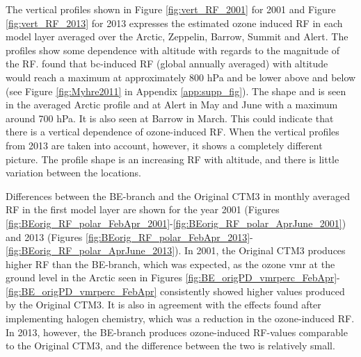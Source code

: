 \medskip

The vertical profiles shown in Figure \ref{fig:vert_RF_2001} for 2001 and Figure \ref{fig:vert_RF_2013} for 2013 expresses the estimated ozone induced RF in each model layer averaged over the Arctic, Zeppelin, Barrow, Summit and Alert. The profiles show some dependence with altitude with regards to the magnitude of the RF. \cite{MYHRE2011387} found that \acrfull{bc}-induced RF (global annually averaged) with altitude would reach a maximum at approximately 800 hPa and be lower above and below (see Figure \ref{fig:Myhre2011} in Appendix \ref{app:supp_fig}). The shape and is seen in the averaged Arctic profile and at Alert in May and June with a maximum around 700 hPa. It is also seen at Barrow in March. This could indicate that there is a vertical dependence of ozone-induced RF. When the vertical profiles from 2013 are taken into account, however, it shows a completely different picture. The profile shape is an increasing RF with altitude, and there is little variation between the locations. 


\medskip

Differences between the BE-branch and the Original CTM3 in monthly averaged RF in the first model layer are shown for the year 2001 (Figures \ref{fig:BEorig_RF_polar_FebApr_2001}-\ref{fig:BEorig_RF_polar_AprJune_2001}) and 2013 (Figures \ref{fig:BEorig_RF_polar_FebApr_2013}-\ref{fig:BEorig_RF_polar_AprJune_2013}). In 2001, the Original CTM3 produces higher RF than the BE-branch, which was expected, as the ozone \acrshort{vmr} at the ground level in the Arctic seen in Figures \ref{fig:BE_origPD_vmrperc_FebApr}-\ref{fig:BE_origPD_vmrperc_FebApr} consistently showed higher values produced by the Original CTM3. It is also in agreement with the effects \cite{Sherwen2017} found after implementing halogen chemistry, which was a reduction in the ozone-induced RF. In 2013, however, the BE-branch produces ozone-induced RF-values comparable to the Original CTM3, and the difference between the two is relatively small. 

\medskip

